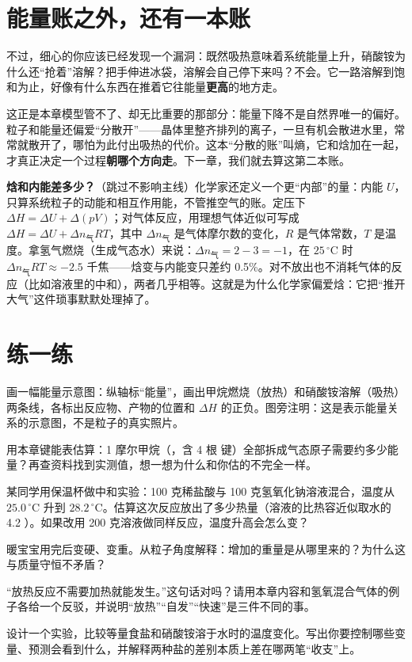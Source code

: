 \section{能量账之外，还有一本账}

不过，细心的你应该已经发现一个漏洞：既然吸热意味着系统能量上升，硝酸铵为什么还“抢着”溶解？把手伸进冰袋，溶解会自己停下来吗？不会。它一路溶解到饱和为止，好像有什么东西在推着它往能量\textbf{更高}的地方走。

这正是本章模型管不了、却无比重要的那部分：能量下降不是自然界唯一的偏好。粒子和能量还偏爱“分散开”——晶体里整齐排列的离子，一旦有机会散进水里，常常就散开了，哪怕为此付出吸热的代价。这本“分散的账”叫熵，它和焓加在一起，才真正决定一个过程\textbf{朝哪个方向走}。下一章，我们就去算这第二本账。

\begin{tiaozhan}
\textbf{焓和内能差多少？}（跳过不影响主线）化学家还定义一个更“内部”的量：内能 $U$，只算系统粒子的动能和相互作用能，不管推空气的账。定压下 $\Delta H=\Delta U+\Delta(pV)$；对气体反应，用理想气体近似可写成 $\Delta H=\Delta U+\Delta n_{\text{气}}RT$，其中 $\Delta n_{\text{气}}$ 是气体摩尔数的变化，$R$ 是气体常数，$T$ 是温度。拿氢气燃烧（生成气态水）来说：$\Delta n_{\text{气}}=2-3=-1$，在 $25\,^{\circ}\mathrm{C}$ 时 $\Delta n_{\text{气}}RT\approx-2.5$ 千焦——焓变与内能变只差约 0.5\%。对不放出也不消耗气体的反应（比如溶液里的中和），两者几乎相等。这就是为什么化学家偏爱焓：它把“推开大气”这件琐事默默处理掉了。
\end{tiaozhan}

\section*{练一练}

\begin{sikaoti}
\item 画一幅能量示意图：纵轴标“能量”，画出甲烷燃烧（放热）和硝酸铵溶解（吸热）两条线，各标出反应物、产物的位置和 $\Delta H$ 的正负。图旁注明：这是表示能量关系的示意图，不是粒子的真实照片。
\item 用本章键能表估算：1 摩尔甲烷（，含 4 根  键）全部拆成气态原子需要约多少能量？再查资料找到实测值，想一想为什么和你估的不完全一样。
\item 某同学用保温杯做中和实验：100 克稀盐酸与 100 克氢氧化钠溶液混合，温度从 $25.0\,^{\circ}\mathrm{C}$ 升到 $28.2\,^{\circ}\mathrm{C}$。估算这次反应放出了多少热量（溶液的比热容近似取水的 4.2 ）。如果改用 200 克溶液做同样反应，温度升高会怎么变？
\item 暖宝宝用完后变硬、变重。从粒子角度解释：增加的重量是从哪里来的？为什么这与质量守恒不矛盾？
\item “放热反应不需要加热就能发生。”这句话对吗？请用本章内容和氢氧混合气体的例子各给一个反驳，并说明“放热”“自发”“快速”是三件不同的事。
\item 设计一个实验，比较等量食盐和硝酸铵溶于水时的温度变化。写出你要控制哪些变量、预测会看到什么，并解释两种盐的差别本质上差在哪两笔“收支”上。
\end{sikaoti}
